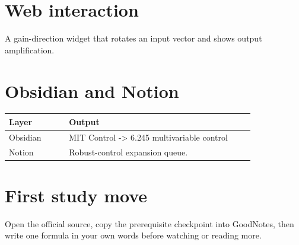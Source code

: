 \documentclass[11pt]{article}
\begin{document}
\section*{Web interaction}
A gain-direction widget that rotates an input vector and shows output amplification.

\section*{Obsidian and Notion}
\begin{tabular}{p{0.22\linewidth}p{0.68\linewidth}}
\toprule
Layer & Output \\
\midrule
Obsidian & MIT Control -> 6.245 multivariable control \\
Notion & Robust-control expansion queue. \\
\bottomrule
\end{tabular}

\section*{First study move}
Open the official source, copy the prerequisite checkpoint into GoodNotes, then write one formula in your own words before watching or reading more.
\end{document}
